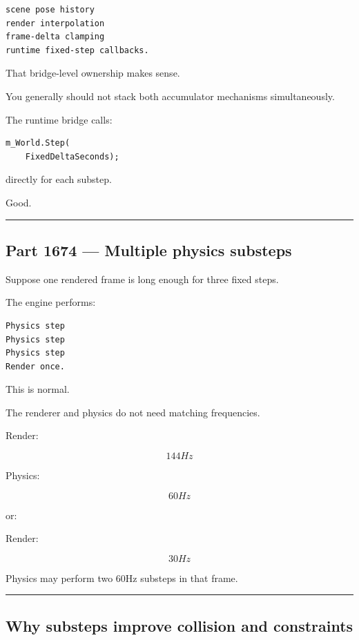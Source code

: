 \begin{verbatim}
scene pose history
render interpolation
frame-delta clamping
runtime fixed-step callbacks.
\end{verbatim}

That bridge-level ownership makes sense.

You generally should not stack both accumulator mechanisms simultaneously.

The runtime bridge calls:

\begin{verbatim}
m_World.Step(
    FixedDeltaSeconds);
\end{verbatim}

directly for each substep.

Good.

\begin{center}\rule{0.5\linewidth}{0.5pt}\end{center}

\subsection{Part 1674 --- Multiple physics substeps}\label{06-engine-ii-ch037-part-1674-multiple-physics-substeps}

\hypertarget{06-engine-ii-ch037-part-1674-multiple-physics-substeps}{}

Suppose one rendered frame is long enough for three fixed steps.

The engine performs:

\begin{verbatim}
Physics step
Physics step
Physics step
Render once.
\end{verbatim}

This is normal.

The renderer and physics do not need matching frequencies.

Render:

\[
144Hz
\]

Physics:

\[
60Hz
\]

or:

Render:

\[
30Hz
\]

Physics may perform two 60Hz substeps in that frame.

\begin{center}\rule{0.5\linewidth}{0.5pt}\end{center}

\subsection{Why substeps improve collision and constraints}\label{06-engine-ii-ch037-why-substeps-improve-collision-and-constraints}

